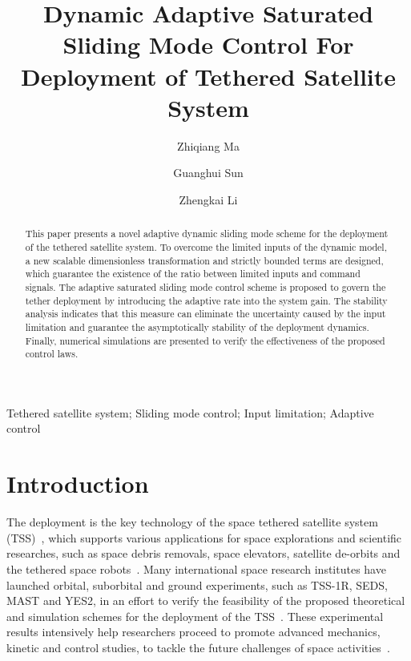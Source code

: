 \documentclass[3p]{elsarticle}
\theoremstyle{plain}
\theoremstyle{remark}
\begin{document}
\begin{frontmatter}
\title{Dynamic Adaptive Saturated Sliding Mode Control For Deployment of Tethered Satellite System}
\author{Zhiqiang Ma}
\author{Guanghui Sun}
{\author{Zhengkai Li}}
\address{Research Institute of Intelligent Control and Systems, Harbin Institute of Technology, Harbin 150001, China}



\begin{abstract}
This paper presents a novel adaptive dynamic sliding mode scheme for the deployment of the tethered satellite system. To overcome the limited inputs of the dynamic model, a new scalable dimensionless transformation and strictly bounded terms are designed, which guarantee the existence of the ratio between limited inputs and command signals. The adaptive saturated sliding mode control scheme is proposed to govern the tether deployment by introducing the adaptive rate into the system gain. The stability analysis indicates that this measure can eliminate the uncertainty caused by the input limitation and guarantee the asymptotically stability of the deployment dynamics. Finally, numerical simulations are presented to verify the effectiveness of the proposed control laws.
\end{abstract}
\begin{keyword}
Tethered satellite system;  Sliding mode control;  Input limitation; Adaptive control
\end{keyword}
\end{frontmatter}
\section{Introduction}
The deployment is the key technology of the space tethered satellite system (TSS)~\cite{wen2008advances,yousefian2015anti}, which supports various applications for space explorations and scientific researches, such as space debris removals, space elevators, satellite de-orbits and the tethered space robots~\cite{zhao2014thrust,kojima2015mission,zhong2013dynamics,zhong2013long,huang2014optimal,Huang2016Impact,Huang201637,Huang2016}. Many international space research institutes have launched orbital, suborbital and ground experiments, such as TSS-1R, SEDS, MAST and YES2, in an effort to verify the feasibility of the proposed theoretical and simulation schemes for the deployment of the TSS~\cite{williams2012review,robitaille2006interpreting,stone1998tss,williams2009yes2}. These experimental results intensively help researchers proceed to promote advanced mechanics, kinetic and control studies, to tackle the future challenges of space activities~\cite{yu2016nonlinear,wen2015space,aslanov2016swing,meng2016lyapunov,zhang2015line,Xu2016Hybrid}.
\end{document}
